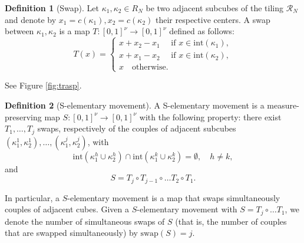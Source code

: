 \documentclass[12 pt]{article}
\theoremstyle{definition} \newtheorem{definition}{Definition}[section]
\theoremstyle{definition} \newtheorem{remark}[definition]{Remark}
\theoremstyle{plain} \newtheorem{lemma}[definition]{Lemma}
\theoremstyle{plain} \newtheorem{proposition}[definition]{Proposition}
\theoremstyle{plain} \newtheorem{theorem}[definition]{Theorem}
\theoremstyle{plain} \newtheorem{corollary}[definition]{Corollary}
\theoremstyle{definition} \newtheorem{example}[definition]{Example}
\theoremstyle{definition} \newtheorem{assumption}[definition]{Assumption}
\theoremstyle{definition} \newtheorem{conjecture}[definition]{Conjecture}
\newcommand{\1}{\mathbbm 1}
\numberwithin{equation}{section}
\begin{document}
\begin{definition}[Swap]
\label{def:swap}
    Let $\kappa_1,\kappa_2\in R_N$ be two adjacent subcubes of the tiling $\mathcal{R}_N$ and denote by $x_1=c(\kappa_1),x_2=c(\kappa_2)$ their respective centers. A swap between $\kappa_1,\kappa_2$ is a map $T:[0,1]^\nu\rightarrow [0,1]^\nu$ defined as follows:
    \begin{equation}\label{eq:swap}
        T(x)=\begin{cases}
              x+x_2-x_1 \quad\text{ if } x\in \text{int}(\kappa_1), \\ 
              x+x_1-x_2 \quad\text{ if } x\in \text{int}(\kappa_2), \\
              x \quad\text{otherwise}.
        \end{cases}
    \end{equation}
\end{definition}
See Figure \ref{fig:trasp}.
\begin{definition}[S-elementary movement]\label{def:S:movement}
    A S-elementary movement is a measure-preserving map $S:[0,1]^\nu\rightarrow[0,1]^\nu$ with the following property: there exist $T_1,\dots,T_j$ swaps, respectively of the  couples of adjacent subcubes $(\kappa^1_1,\kappa^1_2),\dots,(\kappa^j_1,\kappa^j_2)$, with 
    \begin{equation*}
        \text{int}(\kappa^h_1\cup \kappa^h_2)\cap\text{int}(\kappa^k_1\cup \kappa^k_2)=\emptyset, \quad h\not =k,
    \end{equation*}
    and 
    \begin{equation*}
        S=T_j\circ T_{j-1}\circ\dots T_2\circ T_1.
    \end{equation*}
   
\end{definition}
In particular, a $S$-elementary movement is a map that swaps simultaneously couples of adjacent cubes.  Given a $S$-elementary movement with $S=T_j\circ\dots T_1$, we denote the number of simultaneous swaps of $S$ (that is, the number of couples that are swapped simultaneously) by $\text{swap}(S)=j$.

\medskip
\end{document}

